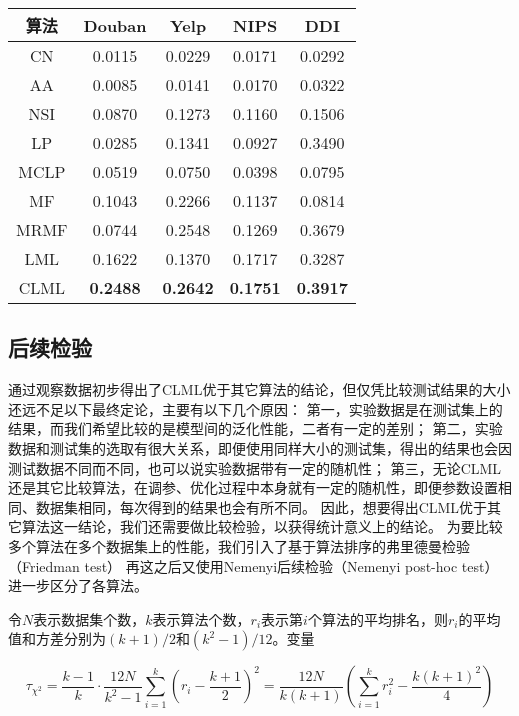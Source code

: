 \begin{center}
    \begin{tabular}{c|cccc} \hline
        算法 &	Douban & Yelp & NIPS & DDI \\ \hline
        CN  & 0.0115 & 0.0229 & 0.0171 & 0.0292 \\
        AA  & 0.0085 & 0.0141 & 0.0170 & 0.0322 \\
        NSI & 0.0870 & 0.1273 & 0.1160 & 0.1506 \\
        LP	& 0.0285 & 0.1341 & 0.0927 & 0.3490 \\
        MCLP& 0.0519 & 0.0750 & 0.0398 & 0.0795 \\
        MF  & 0.1043 & 0.2266 & 0.1137 & 0.0814 \\
        MRMF& 0.0744 & 0.2548 & 0.1269 & 0.3679 \\ \hline
        LML & 0.1622 & 0.1370 & 0.1717 & 0.3287 \\
        CLML& \bfseries 0.2488 & \bfseries 0.2642 & \bfseries 0.1751 & \bfseries 0.3917 \\ \hline
    \end{tabular}
    \label{experiments:table:aupr}
\end{center}

\subsection{后续检验}

通过观察数据初步得出了CLML优于其它算法的结论，但仅凭比较测试结果的大小还远不足以下最终定论，主要有以下几个原因：
第一，实验数据是在测试集上的结果，而我们希望比较的是模型间的泛化性能，二者有一定的差别；
第二，实验数据和测试集的选取有很大关系，即便使用同样大小的测试集，得出的结果也会因测试数据不同而不同，也可以说实验数据带有一定的随机性；
第三，无论CLML还是其它比较算法，在调参、优化过程中本身就有一定的随机性，即便参数设置相同、数据集相同，每次得到的结果也会有所不同。
因此，想要得出CLML优于其它算法这一结论，我们还需要做比较检验，以获得统计意义上的结论。
为要比较多个算法在多个数据集上的性能，我们引入了基于算法排序的弗里德曼检验（Friedman test）
再这之后又使用Nemenyi后续检验（Nemenyi post-hoc test）进一步区分了各算法。


令$N$表示数据集个数，$k$表示算法个数，$r_i$表示第$i$个算法的平均排名，则$r_i$的平均值和方差分别为$(k+1)/2$和$(k^2-1)/12$。变量

\begin{equation}
    \tau_{\chi^2} =\frac{k-1}{k}\cdot\frac{12N}{k^2-1}\sum_{i=1}^k(r_i-\frac{k+1}{2})^2 =\frac{12N}{k(k+1)}(\sum_{i=1}^kr_i^2-\frac{k(k+1)^2}{4})
    \label{experiments:formula:tau}
\end{equation}

